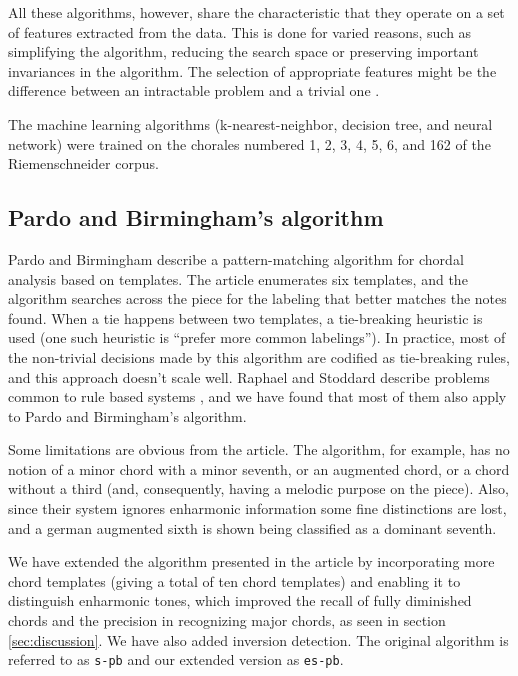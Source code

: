 \documentclass{article}
\begin{document}
All these algorithms, however, share the characteristic that they
operate on a set of features extracted from the data. This is done for
varied reasons, such as simplifying the algorithm, reducing the search
space or preserving important invariances in the algorithm. The
selection of appropriate features might be the difference between an
intractable problem and a trivial one \cite{duda.ea:statistical}.

The machine learning algorithms (k-nearest-neighbor, decision tree,
and neural network) were trained on the chorales numbered 1, 2, 3, 4,
5, 6, and 162 of the Riemenschneider corpus.

\subsection{Pardo and Birmingham's algorithm}
\label{sec:pardo}


Pardo and Birmingham \cite{pardo.ea:algorithms} describe a
pattern-matching algorithm for chordal analysis based on templates.
The article enumerates six templates, and the algorithm searches
across the piece for the labeling that better matches the notes found.
When a tie happens between two templates, a tie-breaking heuristic is
used (one such heuristic is ``prefer more common labelings''). In
practice, most of the non-trivial decisions made by this algorithm are
codified as tie-breaking rules, and this approach doesn't scale
well. Raphael and Stoddard describe problems common to rule based
systems \cite{raphael.ea:harmonic}, and we have found that most of
them also apply to Pardo and Birmingham's algorithm.

Some limitations are obvious from the article. The algorithm, for
example, has no notion of a minor chord with a minor seventh, or an
augmented chord, or a chord without a third (and, consequently, having
a melodic purpose on the piece). Also, since their system ignores
enharmonic information some fine distinctions are lost, and a german
augmented sixth is shown being classified as a dominant seventh.

We have extended the algorithm presented in the article by
incorporating more chord templates (giving a total of ten chord
templates) and enabling it to distinguish enharmonic tones, which
improved the recall of fully diminished chords and the precision in
recognizing major chords, as seen in section \ref{sec:discussion}.  We
have also added inversion detection. The original algorithm is
referred to as \texttt{s-pb} and our extended version as
\texttt{es-pb}.
\end{document}

